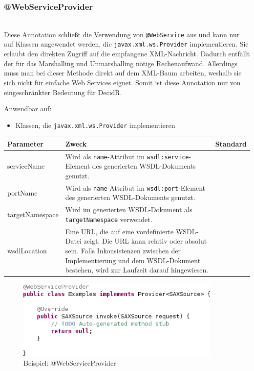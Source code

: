 \documentclass[runningheads]{llncs}
\newcommand{\germanquote}[1]{\glqq{}#1\grqq{}}
\newcommand{\decidr}{DecidR}
\newcommand{\anntabwidth}{\textwidth}
\begin{document}
    \subsubsection{@WebServiceProvider}\ \\
      \nocite{impl_wsprov}
      Diese Annotation schließt die Verwendung von \texttt{@WebService} aus und kann nur auf
      Klassen angewendet werden, die \texttt{javax.xml.ws.Provider} implementieren. Sie erlaubt den
      direkten Zugriff auf die empfangene XML-Nachricht. Dadurch entfällt der für das Marshalling
      und Unmarshalling nötige Rechenaufwand. Allerdings muss man bei dieser Methode direkt auf dem
      XML-Baum arbeiten, weshalb sie sich nicht für einfache Web Services eignet. Somit ist diese
      Annotation nur von eingeschränkter Bedeutung für \decidr{}.

      \noindent{}Anwendbar auf:
      \begin{itemize}
       \item Klassen, die \texttt{javax.xml.ws.Provider} implementieren\vfill
      \end{itemize}
      \tymin=75pt
    \begin{tabulary}{\anntabwidth}{|l|L|L|}
    \hline
    \textbf{Parameter} & \textbf{Zweck} & \textbf{Standard} \\
    \hline
      serviceName &
      Wird als \texttt{name}-Attribut im \texttt{wsdl:service}-Element des generierten
      WSDL-\linebreak[0]Dokuments genutzt. &
      \germanquote{} \\
    \hline
      portName &
      Wird als \texttt{name}-Attribut im \texttt{wsdl:port}-Element des generierten
      WSDL-\linebreak[0]Dokuments genutzt. &
      \germanquote{} \\
    \hline
      targetNamespace &
      Wird im generierten WSDL-Dokument als \texttt{targetNamespace} verwendet. &
      \germanquote{} \\
    \hline
      wsdlLocation &
      Eine URL, die auf eine vordefinierte WSDL-Datei zeigt. Die URL kann relativ oder absolut
      sein. Falls Inkonsistenzen zwischen der Implementierung und dem WSDL-Dokument bestehen, wird
      zur Laufzeit darauf hingewiesen. &
      \germanquote{} \\
    \hline
    \end{tabulary} \vfill
    \tymin=10pt
    \begin{figure}[ht!]
      \centering
      \includegraphics[width=0.9\textwidth]{../images/AtWebServiceProvider.png}
      \caption{Beispiel: @WebServiceProvider}
      \label{fig:wsp}
    \end{figure}
\end{document}
